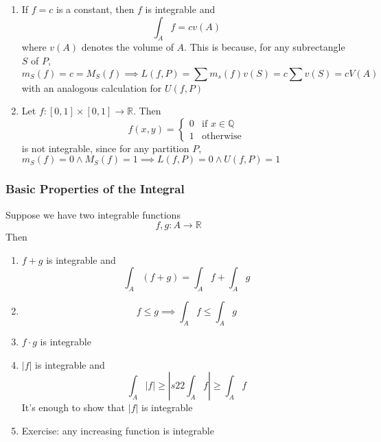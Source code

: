 \documentclass{article}
\newcommand{\reals}[0]{\mathbb{R}}
\newcommand{\rationals}[0]{\mathbb{Q}}
\begin{document}
\begin{enumerate}

  \item If \(f = c\) is a constant, then \(f\) is integrable and
  \begin{equation}\int_Af = cv(A)\end{equation}
  where \(v(A)\) denotes the volume of \(A\). This is because, for any subrectangle \(S\) of \(P\),
  \begin{equation}m_S(f) = c = M_S(f) \implies L(f, P) = \sum m_s(f)v(S) = c\sum v(S) = cV(A)\end{equation}
  with an analogous calculation for \(U(f, P)\)

  \item Let \(f: [0, 1] \times [0, 1] \to \reals\). Then
  \begin{equation}f(x, y) = \left\{\begin{array}{cc}
    0 & \text{if } x \in \rationals \\
    1 & \text{otherwise}
  \end{array}\right.\end{equation}
  is not integrable, since for any partition \(P\),
  \(m_S(f) = 0 \land M_S(f) = 1 \implies L(f, P) = 0 \land U(f, P) = 1\)

\end{enumerate}

\subsubsection{Basic Properties of the Integral}

Suppose we have two integrable functions
\begin{equation}f, g: A \to \reals\end{equation}
Then
\begin{enumerate}

  \item \(f + g\) is integrable and
  \begin{equation}\int_A(f + g) = \int_Af + \int_Ag\end{equation}

  \item \begin{equation}f \leq g \implies \int_Af \leq \int_Ag\end{equation}

  \item \(f \cdot g\) is integrable

  \item \(|f|\) is integrable and \begin{equation}
  \int_A|f| \geq \left|s22\int_Af\right| \geq \int_Af\end{equation}
  It's enough to show that \(|f|\) is integrable

  \item Exercise: any increasing function is integrable

\end{enumerate}
\end{document}
